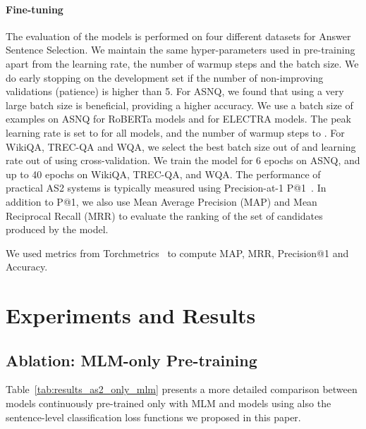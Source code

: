 \paragraph{Fine-tuning} The evaluation of the models is performed on four different datasets for Answer Sentence Selection. We maintain the same hyper-parameters used in pre-training apart from the learning rate, the number of warmup steps and the batch size. We do early stopping on the development set if the number of non-improving validations (patience) is higher than 5. For ASNQ, we found that using a very large batch size is beneficial, providing a higher accuracy. We use a batch size of  examples on ASNQ for RoBERTa models and  for ELECTRA models. The peak learning rate is set to  for all models, and the number of warmup steps to . For WikiQA, TREC-QA and WQA, we select the best batch size out of  and learning rate out of  using cross-validation. We train the model for 6 epochs on ASNQ, and up to 40 epochs on WikiQA, TREC-QA, and WQA. The performance of practical AS2 systems is typically measured using Precision-at-1 P@1~\cite{garg-moschitti-2021-will}. In addition to P@1, we also use Mean Average Precision (MAP) and Mean Reciprocal Recall (MRR) to evaluate the ranking of the set of candidates produced by the model.

We used metrics from Torchmetrics~\cite{torchmetrics} to compute MAP, MRR, Precision@1 and Accuracy.


\section{Experiments and Results} 

\subsection{Ablation: MLM-only Pre-training}
Table~\ref{tab:results_as2_only_mlm} presents a more detailed comparison between models continuously pre-trained only with MLM and models using also the sentence-level classification loss functions we proposed in this paper.

